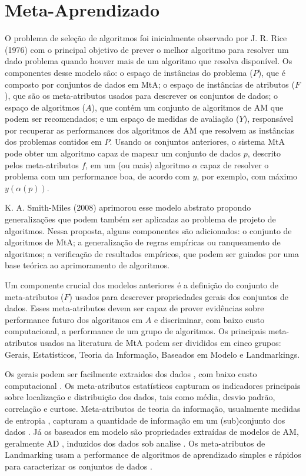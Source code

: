 \section{Meta-Aprendizado}
\label{sec:metalearning}
O problema de seleção de algoritmos foi inicialmente observado por J. R. Rice (1976) \cite{Rice1976} com o principal objetivo de prever o melhor algoritmo para resolver um dado problema quando houver mais de um algoritmo que resolva disponível.
Os componentes desse modelo são: o espaço de instâncias do problema ($P$), que é composto por conjuntos de dados em MtA; o espaço de instâncias de atributos ($F$), que são os meta-atributos usados para descrever os conjuntos de dados; o espaço de algoritmos ($A$), que contém um conjunto de algoritmos de AM que podem ser recomendados; e um espaço de medidas de avaliação ($Y$), responsável por recuperar as performances dos algoritmos de AM que resolvem as instâncias dos problemas contidos em $P$.
Usando os conjuntos anteriores, o sistema MtA pode obter um algoritmo capaz de mapear um conjunto de dados $p$, descrito pelos meta-atributos $f$, em um (ou mais) algoritmo $\alpha$ capaz de resolver o problema com um performance boa, de acordo com $y$, por exemplo, com máximo $y(\alpha(p))$.

K. A. Smith-Miles (2008) \cite{SmithMiles2008} 
aprimorou esse modelo abstrato propondo generalizações que podem também ser aplicadas ao problema de projeto de algoritmos.
Nessa proposta, alguns componentes são adicionados: o conjunto de algoritmos de MtA; a generalização de regras empíricas ou ranqueamento de algoritmos; a verificação de resultados empíricos, que podem ser guiados por uma base teórica ao aprimoramento de algoritmos.

Um componente crucial dos modelos anteriores é a definição do conjunto de meta-atributos ($F$) usados para descrever propriedades gerais dos conjuntos de dados.
Esses meta-atributos devem ser capaz de prover evidências sobre performance futuro dos algoritmos em $A$ \cite{Soares2001, Reif2012}
e discriminar, com baixo custo computacional, a performance de um grupo de algoritmos.
Os principais meta-atributos usados na literatura de MtA podem ser divididos em cinco grupos: Gerais, Estatísticos, Teoria da Informação, Baseados em Modelo e Landmarkings.

Os gerais podem ser facilmente extraidos dos dados \cite{Reif2014}, com baixo custo computacional \cite{Reif2012}.
Os meta-atributos estatísticos capturam os indicadores principais sobre localização e distribuição dos dados, tais como média, desvio padrão, correlação e curtose.
Meta-atributos de teoria da informação, usualmente medidas de entropia \cite{Segrera2008}, capturam a quantidade de informação em um (sub)conjunto dos dados \cite{SmithMiles2008}.
Já os baseados em modelo são propriedades extraídas de modelos de AM, geralmente AD \cite{Bensusan2000, Peng2002}, induzidos dos dados sob analise \cite{Reif2014}.
Os meta-atributos de Landmarking usam a performance de algoritmos de aprendizado simples e rápidos para caracterizar os conjuntos de dados \cite{SmithMiles2008}. 

